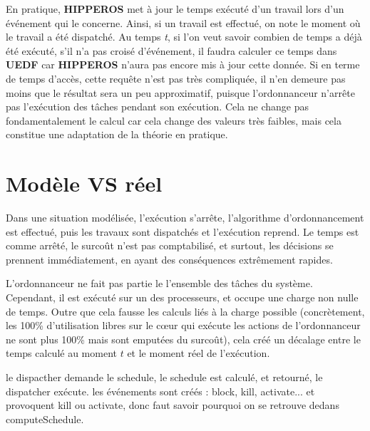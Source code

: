 		En pratique, \textbf{HIPPEROS} met à jour le temps exécuté d'un travail lors d'un événement qui le concerne. 
		Ainsi, si un travail est effectué, on note le moment où le travail a été dispatché.
		Au temps \textit{t}, si l'on veut savoir combien de temps a déjà été exécuté, 
		s'il n'a pas croisé d'événement, il faudra calculer ce temps dans \textbf{UEDF} 
		car \textbf{HIPPEROS} n'aura pas encore mis à jour cette donnée.\newline
		Si en terme de temps d'accès, cette requête n'est pas très compliquée, il n'en demeure pas moins 
		que le résultat sera un peu approximatif, puisque l'ordonnanceur n'arrête pas l'exécution des tâches pendant 
		son exécution. Cela ne change pas fondamentalement le calcul car cela change des valeurs très faibles, 
		mais cela constitue une adaptation de la théorie en pratique.\newline

	\section{Modèle VS réel}
	
		Dans une situation modélisée, l'exécution s'arrête, l'algorithme d'ordonnancement est effectué, 
		puis les travaux sont dispatchés et l'exécution reprend.
		Le temps est comme arrêté, le surcoût n'est pas comptabilisé, et surtout, les décisions se prennent 
		immédiatement, en ayant des conséquences extrêmement rapides.
		\newline
		
		L'ordonnanceur ne fait pas partie le l'ensemble des tâches du système. Cependant, il est exécuté 
		sur un des processeurs, et occupe une charge non nulle de temps. Outre que cela fausse les calculs 
		liés à la charge possible (concrètement, les 100\% d'utilisation libres sur le cœur qui exécute 
		les actions de l'ordonnanceur ne sont plus 100\% mais sont emputées du surcoût), 
		cela créé un décalage entre le temps calculé au moment $t$ et le moment réel de l'exécution.\newline

		
		
		le dispacther demande le schedule, 
		le schedule est calculé, et retourné,
		le dispatcher exécute.
		les événements sont créés : block, kill, activate... et provoquent kill ou activate, donc faut 
		savoir pourquoi on se retrouve dedans computeSchedule.

